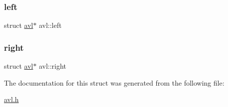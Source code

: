 \subsubsection{\texorpdfstring{left}{left}}
{\footnotesize\ttfamily struct \hyperlink{structavl}{avl}$\ast$ avl\+::left}

\mbox{\label{structavl_afaccb3499fc54bb80a23e88c3316fd9d}} 
\subsubsection{\texorpdfstring{right}{right}}
{\footnotesize\ttfamily struct \hyperlink{structavl}{avl}$\ast$ avl\+::right}



The documentation for this struct was generated from the following file\+:\begin{DoxyCompactItemize}
\item 
\hyperlink{avl_8h}{avl.\+h}\end{DoxyCompactItemize}
